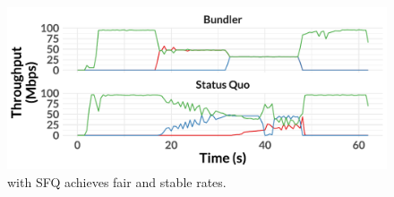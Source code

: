\begin{figure}
    \centering
\begin{knitrout}
\color{fgcolor}
\includegraphics[width=\maxwidth]{figure/eval_waterfall-1} 

\end{knitrout}
    \caption{\name with SFQ achieves fair and stable rates.}
    \label{fig:eval:waterfall}
\end{figure}
